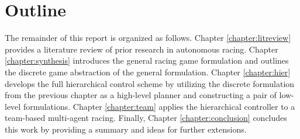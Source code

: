 \section{Outline}
The remainder of this report is organized as follows. 
Chapter \ref{chapter:litreview} provides a literature review of prior research in autonomous racing. 
Chapter \ref{chapter:synthesis} introduces the general racing game formulation and outlines the discrete game abstraction of the general formulation. 
Chapter \ref{chapter:hier} develops the full hierarchical control scheme by utilizing the discrete formulation from the previous chapter as a high-level planner and constructing a pair of low-level formulations. 
Chapter \ref{chapter:team} applies the hierarchical controller to a team-based multi-agent racing. 
Finally, Chapter \ref{chapter:conclusion} concludes this work by providing a summary and ideas for further extensions. 